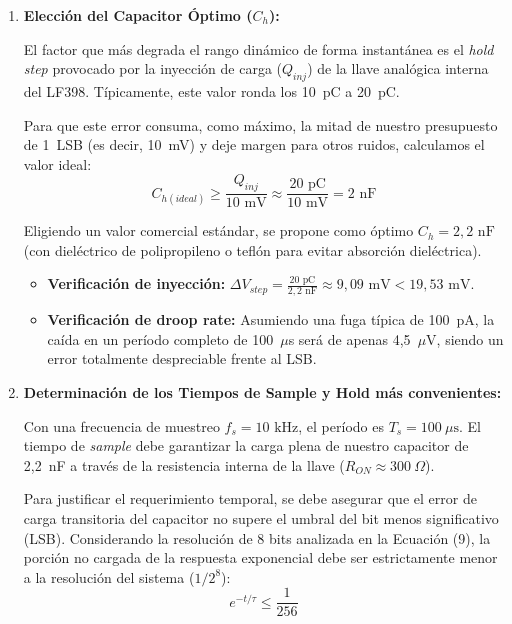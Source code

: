 \begin{enumerate}
	\item \textbf{Elección del Capacitor Óptimo ($C_h$):}
	
	El factor que más degrada el rango dinámico de forma instantánea es el \textit{hold step} provocado por la inyección de carga ($Q_{inj}$) de la llave analógica interna del LF398. Típicamente, este valor ronda los 10~pC a 20~pC.
	
	Para que este error consuma, como máximo, la mitad de nuestro presupuesto de 1~LSB (es decir, 10~mV) y deje margen para otros ruidos, calculamos el valor ideal:
	\begin{equation}
		C_{h(ideal)} \ge \frac{Q_{inj}}{10\text{ mV}} \approx \frac{20\text{ pC}}{10\text{ mV}} = 2\text{ nF}
	\end{equation}
	
	Eligiendo un valor comercial estándar, se propone como óptimo $C_h = 2,2\text{ nF}$ (con dieléctrico de polipropileno o teflón para evitar absorción dieléctrica).
	
	\begin{itemize}
		\item \textbf{Verificación de inyección:} $\Delta V_{step} = \frac{20\text{ pC}}{2,2\text{ nF}} \approx 9,09\text{ mV} < 19,53\text{ mV}$.
		\item \textbf{Verificación de droop rate:} Asumiendo una fuga típica de 100~pA, la caída en un período completo de 100~$\mu$s será de apenas 4,5~$\mu$V, siendo un error totalmente despreciable frente al LSB.
	\end{itemize}
	\newpage
	\item \textbf{Determinación de los Tiempos de Sample y Hold más convenientes:}
	
	Con una frecuencia de muestreo $f_s = 10\text{ kHz}$, el período es $T_s = 100\ \mu\text{s}$. El tiempo de \textit{sample} debe garantizar la carga plena de nuestro capacitor de 2,2~nF a través de la resistencia interna de la llave ($R_{ON} \approx 300\ \Omega$).
	
	Para justificar el requerimiento temporal, se debe asegurar que el error de carga transitoria del capacitor no supere el umbral del bit menos significativo (LSB). Considerando la resolución de 8 bits analizada en la Ecuación (9), la porción no cargada de la respuesta exponencial debe ser estrictamente menor a la resolución del sistema ($1/2^8$):
	\begin{equation}
		e^{-t/\tau} \le \frac{1}{256}
	\end{equation}
	

\end{enumerate}
